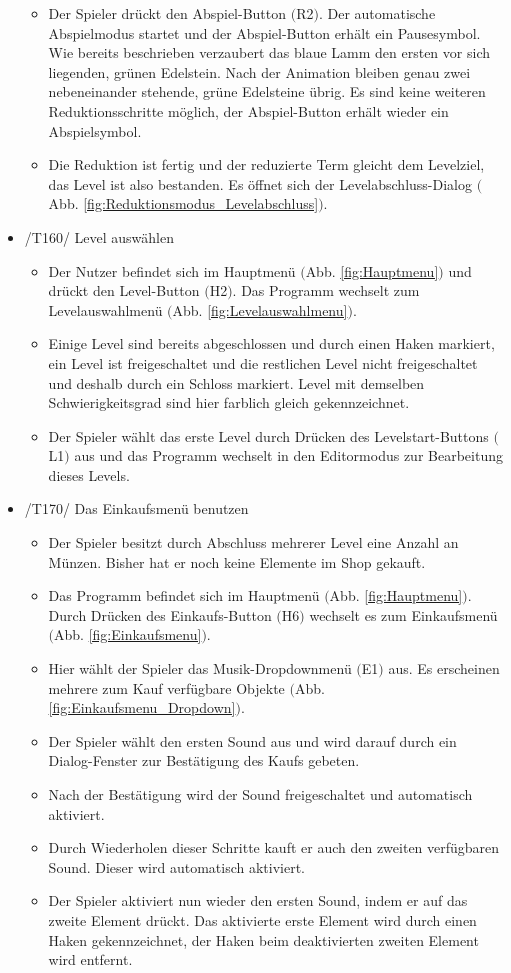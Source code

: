 \begin{itemize}
\begin{itemize}
\item Der Spieler drückt den Abspiel-Button $($R2$)$. Der automatische Abspielmodus startet und der Abspiel-Button erhält ein Pausesymbol. Wie bereits beschrieben verzaubert das blaue Lamm den ersten vor sich liegenden, grünen Edelstein. Nach der Animation bleiben genau zwei nebeneinander stehende, grüne Edelsteine übrig. Es sind keine weiteren Reduktionsschritte möglich, der Abspiel-Button erhält wieder ein Abspielsymbol.
\item Die Reduktion ist fertig und der reduzierte Term gleicht dem Levelziel, das Level ist also bestanden. Es öffnet sich der Levelabschluss-Dialog $($Abb. \ref{fig:Reduktionsmodus_Levelabschluss}$)$.
\end{itemize}

\item /T160/ Level auswählen
\begin{itemize}
\item Der Nutzer befindet sich im Hauptmenü $($Abb. \ref{fig:Hauptmenu}$)$ und drückt den Level-Button $($H2$)$. Das Programm wechselt zum Levelauswahlmenü $($Abb. \ref{fig:Levelauswahlmenu}$)$.
\item Einige Level sind bereits abgeschlossen und durch einen Haken markiert, ein Level ist freigeschaltet und die restlichen Level nicht freigeschaltet und deshalb durch ein Schloss markiert. Level mit demselben Schwierigkeitsgrad sind hier farblich gleich gekennzeichnet.
\item Der Spieler wählt das erste Level durch Drücken des Levelstart-Buttons $($L1$)$ aus und das Programm wechselt in den Editormodus zur Bearbeitung dieses Levels.
\end{itemize}

\item /T170/ Das Einkaufsmenü benutzen
\begin{itemize}
\item Der Spieler besitzt durch Abschluss mehrerer Level eine Anzahl an Münzen. Bisher hat er noch keine Elemente im Shop gekauft.
\item Das Programm befindet sich im Hauptmenü $($Abb. \ref{fig:Hauptmenu}$)$. Durch Drücken des Einkaufs-Button $($H6$)$ wechselt es zum Einkaufsmenü $($Abb. \ref{fig:Einkaufsmenu}$)$.
\item Hier wählt der Spieler das Musik-Dropdownmenü $($E1$)$ aus. Es erscheinen mehrere zum Kauf verfügbare Objekte $($Abb. \ref{fig:Einkaufsmenu_Dropdown}$)$.
\item Der Spieler wählt den ersten Sound aus und wird darauf durch ein Dialog-Fenster zur Bestätigung des Kaufs gebeten.
\item Nach der Bestätigung wird der Sound freigeschaltet und automatisch aktiviert.
\item Durch Wiederholen dieser Schritte kauft er auch den zweiten verfügbaren Sound. Dieser wird automatisch aktiviert.
\item Der Spieler aktiviert nun wieder den ersten Sound, indem er auf das zweite Element drückt. Das aktivierte erste Element wird durch einen Haken gekennzeichnet, der Haken beim deaktivierten zweiten Element wird entfernt.
\end{itemize}


\end{itemize}
